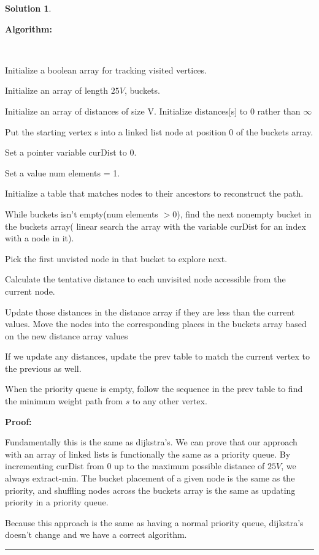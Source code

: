 \documentclass{article}
\theoremstyle{definition}
\def\fline{\rule{0.75\linewidth}{0.5pt}}
\newcommand{\finishline}{\begin{center}\fline\end{center}}
\newtheorem*{solution*}{Solution}
\newenvironment{solution}{\begin{solution*}}{{\finishline} \end{solution*}}
\begin{document}
\begin{solution}

    \

    \textbf{Algorithm:}

    \

    Initialize a boolean array for tracking visited vertices.
    
    Initialize an array of length $25V$, buckets.

    Initialize an array of distances of size V. Initialize distances[s] to 0 rather than $\infty$

    Put the starting vertex s into a linked list node at position 0 of the buckets array.

    Set a pointer variable curDist to 0.

    Set a value num elements = 1.

    Initialize a table that matches nodes to their ancestors to reconstruct the path.
    
    While buckets isn't empty(num elements $> 0$), find the next nonempty bucket in the buckets array( linear search the array with the variable curDist for an index with a node in it).

    Pick the first unvisted node in that bucket to explore next. 

    Calculate the tentative distance to each unvisited node accessible from the current node.

    Update those distances in the distance array if they are less than the current values. Move the nodes into the corresponding places in the buckets array based on the new distance array values

    If we update any distances, update the prev table to match the current vertex to the previous as well.

    When the priority queue is empty, follow the sequence in the prev table to find the minimum weight path from $s$ to any other vertex.
    

    \textbf{Proof: }
    \

    Fundamentally this is the same as dijkstra's. We can prove that our approach with an array of linked lists is functionally the same as a priority queue. By incrementing curDist from 0 up to the maximum possible distance of $25V$, we always extract-min. The bucket placement of a given node is the same as the priority, and shuffling nodes across the buckets array is the same as updating priority in a priority queue. 

    Because this approach is the same as having a normal priority queue, dijkstra's doesn't change and we have a correct algorithm.
    \


\end{solution}
\end{document}
